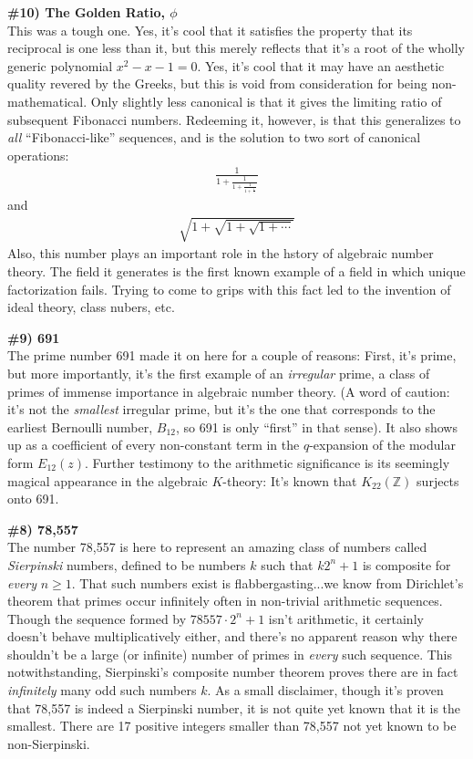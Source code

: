 \documentclass[12pt]{article}
\newcommand{\mb}{\mathbb}
\newcommand{\Z}{\mb{Z}}
\newcommand{\<}{\langle}
\renewcommand{\>}{\rangle}
\begin{document}
\textbf{{\Large \#10) The Golden Ratio, $\phi$}}\\ This was a tough
one.  Yes, it's cool that it satisfies the property that its
reciprocal is one less than it, but this merely reflects that it's a
root of the wholly generic polynomial $x^2-x-1=0$.  Yes, it's cool
that it may have an aesthetic quality revered by the Greeks, but this
is void from consideration for being non-mathematical.  Only slightly
less canonical is that it gives the limiting ratio of subsequent
Fibonacci numbers.  Redeeming it, however, is that this generalizes to
\emph{all} ``Fibonacci-like'' sequences, and is the solution to two
sort of canonical operations: 
\begin{align*}
\frac{1}{1+\frac{1}{1+\frac{1}{1+\frac{1}{\ddots}}}}   
\end{align*}
and
\begin{align*}
\sqrt{1+\sqrt{1+\sqrt{1+\cdots}}}
\end{align*}
Also, this number plays an important role in the hstory of algebraic
number theory.  The field it generates is the first known example of a
field in which unique factorization fails.  Trying to come to grips with 
this fact led to the invention of ideal theory, class nubers, etc.

\textbf{{\Large \#9) 691}}\\ The prime number 691 made it on here for
a couple of reasons: First, it's prime, but more importantly, it's the
first example of an \emph{irregular} prime, a class of primes of
immense importance in algebraic number theory.  (A word of caution:
it's not the \emph{smallest} irregular prime, but it's the one that
corresponds to the earliest Bernoulli number, $B_{12}$, so 691 is only
``first'' in that sense).  It also shows up as a coefficient of every
non-constant term in the $q$-expansion of the modular form
$E_{12}(z)$. Further testimony to the arithmetic significance is its
seemingly magical appearance in the algebraic $K$-theory: It's known
that $K_{22}(\Z)$ surjects onto 691.

\textbf{{\Large \#8) 78,557}}\\ The number 78,557 is here to represent
an amazing class of numbers called \emph{Sierpinski} numbers, defined
to be numbers $k$ such that $k2^n+1$ is composite for \emph{every}
$n\geq 1$.  That such numbers exist is flabbergasting...we know from
Dirichlet's theorem that primes occur infinitely often in non-trivial
arithmetic sequences.  Though the sequence formed by $78557\cdot
2^n+1$ isn't arithmetic, it certainly doesn't behave multiplicatively
either, and there's no apparent reason why there shouldn't be a large
(or infinite) number of primes in \emph{every} such sequence.  This
notwithstanding, Sierpinski's composite number theorem proves there
are in fact \emph{infinitely} many odd such numbers $k$.  As a small
disclaimer, though it's proven that 78,557 is indeed a Sierpinski
number, it is not quite yet known that it is the smallest.  There are
17 positive integers smaller than 78,557 not yet known to be
non-Sierpinski.
\end{document}

